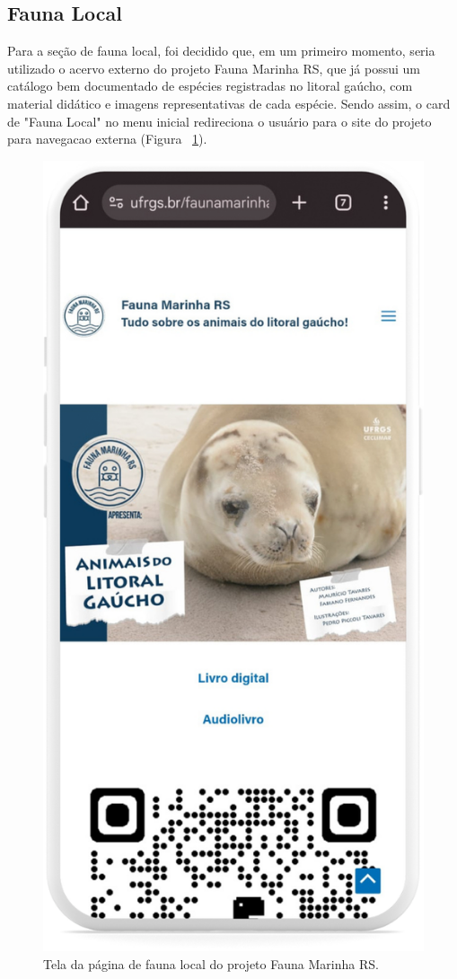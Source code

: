 \subsection{Fauna Local}
Para a seção de fauna local, foi decidido que, em um primeiro momento,
seria utilizado o acervo externo do projeto Fauna Marinha RS, que já possui um catálogo bem documentado 
de espécies registradas no litoral gaúcho, com material didático e imagens representativas de cada espécie.
Sendo assim, o card de "Fauna Local" no menu inicial redireciona o usuário para o site do projeto 
para navegacao externa (Figura ~\ref{fig:fauna_local}).

 \begin{figure}[H]
    \centering
    \includegraphics[height=0.7\textheight]{imagens/sistema/device_frame/faunaLocal.png}
    \caption{Tela da página de fauna local do projeto Fauna Marinha RS.}
    \label{fig:fauna_local}
\end{figure}
